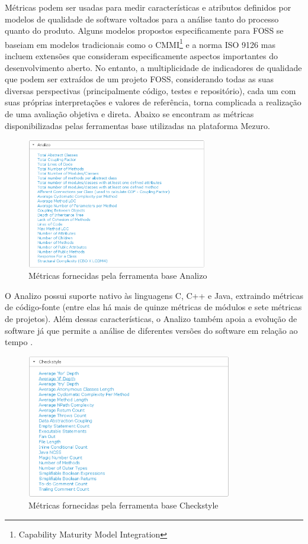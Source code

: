 Métricas podem ser usadas para medir características e atributos definidos por modelos de qualidade de software voltados para a análise tanto do processo quanto do produto. Alguns modelos propostos especificamente para FOSS se baseiam em modelos tradicionais como o CMMI\footnote{Capability Maturity Model Integration}\cite{paulk1994capability} e a norma ISO 9126\cite{iso2003iec} mas incluem extensões que consideram especificamente aspectos importantes do desenvolvimento aberto. No entanto, a multiplicidade de indicadores de qualidade que podem ser extraídos de um projeto FOSS, considerando todas as suas diversas perspectivas (principalmente código, testes e repositório), cada um com suas próprias interpretações e valores de referência, torna complicada a realização de uma avaliação objetiva e direta. Abaixo se encontram as métricas disponibilizadas pelas ferramentas base utilizadas na plataforma Mezuro.

\graphicspath{{figuras/}}
\begin{figure}[H]
\centering
\includegraphics[width=0.7\textwidth]{analizo_bt}
\caption{Métricas fornecidas pela ferramenta base Analizo}
\label{fig-analizo_bt}
\end{figure}

O Analizo possui suporte nativo às linguagens C, C++ e Java, extraindo métricas de código-fonte (entre elas há mais de quinze métricas de módulos e sete métricas de projetos). Além dessas características, o Analizo também apoia a evolução de software já que permite a análise de diferentes versões do software em relação ao tempo .

\graphicspath{{figuras/}}
\begin{figure}[htpb]
\centering
\includegraphics[width=0.8\textwidth]{checkstyle_bt}
\caption{Métricas fornecidas pela ferramenta base Checkstyle}
\label{fig-checkstyle_bt}
\end{figure}

